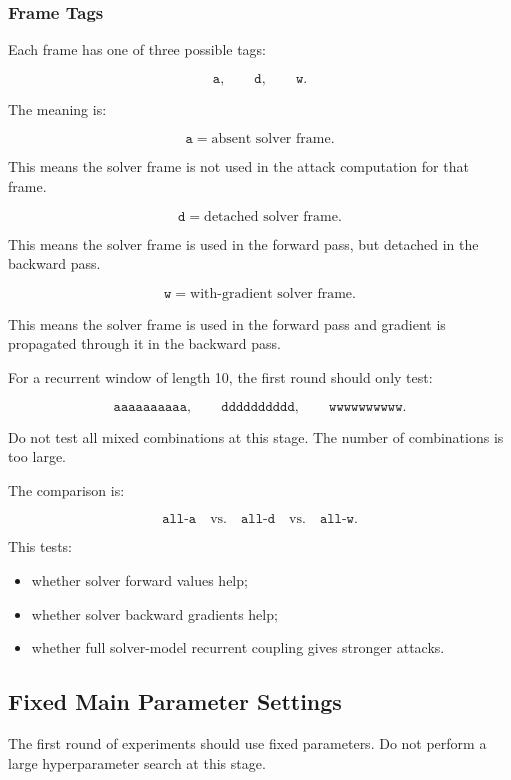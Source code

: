 \documentclass{article}
\begin{document}
\subsubsection{Frame Tags}

Each frame has one of three possible tags:

\[
\texttt{a},
\qquad
\texttt{d},
\qquad
\texttt{w}.
\]

The meaning is:

\[
\texttt{a}
=
\text{absent solver frame}.
\]

This means the solver frame is not used in the attack computation for that frame.

\[
\texttt{d}
=
\text{detached solver frame}.
\]

This means the solver frame is used in the forward pass, but detached in the backward pass.

\[
\texttt{w}
=
\text{with-gradient solver frame}.
\]

This means the solver frame is used in the forward pass and gradient is propagated through it in the backward pass.

For a recurrent window of length 10, the first round should only test:

\[
\texttt{aaaaaaaaaa},
\qquad
\texttt{dddddddddd},
\qquad
\texttt{wwwwwwwwww}.
\]

Do not test all mixed combinations at this stage. The number of combinations is too large.

The comparison is:

\[
\texttt{all-a}
\quad
\text{vs.}
\quad
\texttt{all-d}
\quad
\text{vs.}
\quad
\texttt{all-w}.
\]

This tests:

\begin{itemize}
    \item whether solver forward values help;
    \item whether solver backward gradients help;
    \item whether full solver-model recurrent coupling gives stronger attacks.
\end{itemize}

\subsection{Fixed Main Parameter Settings}

The first round of experiments should use fixed parameters. Do not perform a large hyperparameter search at this stage.
\end{document}
